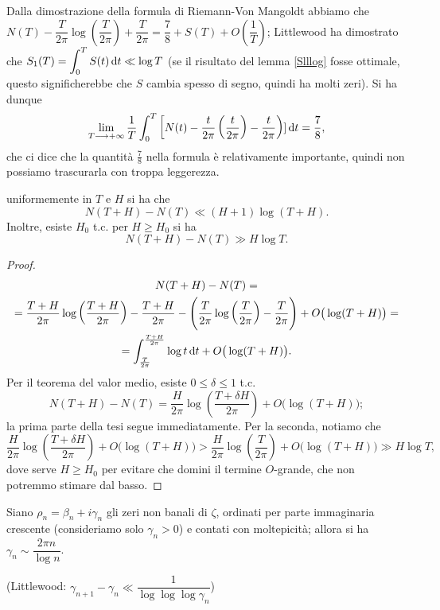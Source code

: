 Dalla dimostrazione della formula di Riemann-Von Mangoldt abbiamo che $N(T)-\dfrac{T}{2\pi}\log\left(\dfrac{T}{2\pi}\right)+\dfrac{T}{2\pi}=\dfrac{7}{8}+S(T)+O\left(\dfrac{1}{T}\right)$;
Littlewood ha dimostrato che $\displaystyle S_1(T)=\int_0^T S(t)\mathop{}\!\mathrm{d} t \ll \log{T}$ (se il risultato del lemma \ref{Slllog} fosse ottimale, questo significherebbe che $S$ cambia spesso di segno, quindi ha molti zeri). Si ha dunque
$$\lim_{T \longrightarrow +\infty} \frac{1}{T} \int_0^T \left[N(t)-\frac{t}{2\pi}\left(\frac{t}{2\pi}\right)-\frac{t}{2\pi}\right)]\mathop{}\!\mathrm{d} t=\frac{7}{8},$$
che ci dice che la quantità $\frac{7}{8}$ nella formula è relativamente importante, quindi non possiamo trascurarla con troppa leggerezza.

\begin{cor}
  uniformemente in $T$ e $H$ si ha che
  $$N(T+H)-N(T) \ll (H+1)\log(T+H).$$
  Inoltre, esiste $H_0$ t.c. per $H \ge H_0$ si ha
  $$N(T+H)-N(T) \gg H\log{T}.$$
\end{cor}

\begin{proof}
  \begin{gather*}
    N(T+H)-N(T)= \\
    =\frac{T+H}{2\pi}\log\left(\frac{T+H}{2\pi}\right)-\frac{T+H}{2\pi}-\Bigg(\frac{T}{2\pi}\log\left(\frac{T}{2\pi}\right)-\frac{T}{2\pi}\Bigg)+O\big(\log(T+H)\big)= \\
    =\int_{\frac{T}{2\pi}}^{\frac{T+H}{2\pi}} \log{t}\mathop{}\!\mathrm{d} t+O\big(\log(T+H)\big).
  \end{gather*}
  Per il teorema del valor medio, esiste $0 \le \delta \le 1$ t.c.
  $$N(T+H)-N(T)=\frac{H}{2\pi}\log\left(\frac{T+\delta H}{2\pi}\right)+O\big(\log(T+H)\big);$$
  la prima parte della tesi segue immediatamente. Per la seconda, notiamo che
  $$\frac{H}{2\pi}\log\left(\frac{T+\delta H}{2\pi}\right)+O\big(\log(T+H)\big)>\frac{H}{2\pi}\log\left(\frac{T}{2\pi}\right)+O\big(\log(T+H)\big) \gg H\log{T},$$
  dove serve $H \ge H_0$ per evitare che domini il termine $O$-grande, che non potremmo stimare dal basso.
\end{proof}

\begin{cor}
  Siano $\rho_n=\beta_n+i\gamma_n$ gli zeri non banali di $\zeta$, ordinati per parte immaginaria crescente (consideriamo solo $\gamma_n>0$) e contati con moltepicità; allora si ha $\gamma_n \sim \dfrac{2\pi n}{\log n}$.

  (Littlewood: $\gamma_{n+1}-\gamma_n \ll \dfrac{1}{\log{\log{\log{\gamma_n}}}}$)
\end{cor}

